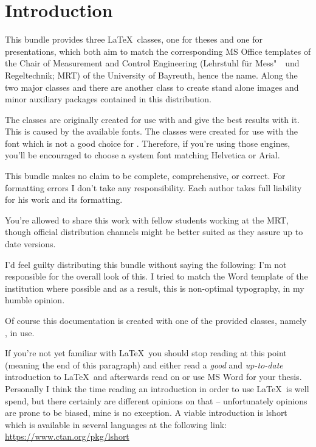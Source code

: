 \chapter{Introduction}
This bundle provides three \LaTeX\ classes, one for theses and one for
presentations, which both aim to match the corresponding MS Office templates of
the Chair of Measurement and Control Engineering (Lehrstuhl für Mess"~~und
Regeltechnik; MRT) of the University of Bayreuth, hence the name. Along the two
major classes  and  there are another class to
create stand alone images and minor auxiliary packages contained in this
distribution.

The classes are originally created for use with  and give the
best results with it. This is caused by the available fonts. The classes were
created for use with the  font which is not a good choice for
\luaxelatex*. Therefore, if you're using those engines, you'll be encouraged to
choose a system font matching Helvetica or Arial.

This bundle makes no claim to be complete, comprehensive, or correct. For
formatting errors I don't take any responsibility. Each author takes full
liability for his work and its formatting.

You're allowed to share this work with fellow students working at the MRT,
though official distribution channels might be better suited as they assure up
to date versions.

I'd feel guilty distributing this bundle without saying the following: I'm not
responsible for the overall look of this. I tried to match the Word template of
the institution where possible and as a result, this is non-optimal typography,
in my humble opinion.

Of course this documentation is created with one of the provided classes, namely
, in use.

If you're not yet familiar with \LaTeX\ you should stop reading at this point
(meaning the end of this paragraph) and either read a \emph{good} and
\emph{up-to-date} introduction to \LaTeX\ and afterwards read on or use MS Word
for your thesis. Personally I think the time reading an introduction in order to
use \LaTeX\ is well spend, but there certainly are different opinions on that --
unfortunately opinions are prone to be biased, mine is no exception. A viable
introduction is lshort which is available in several languages at the following
link: \url{https://www.ctan.org/pkg/lshort}

